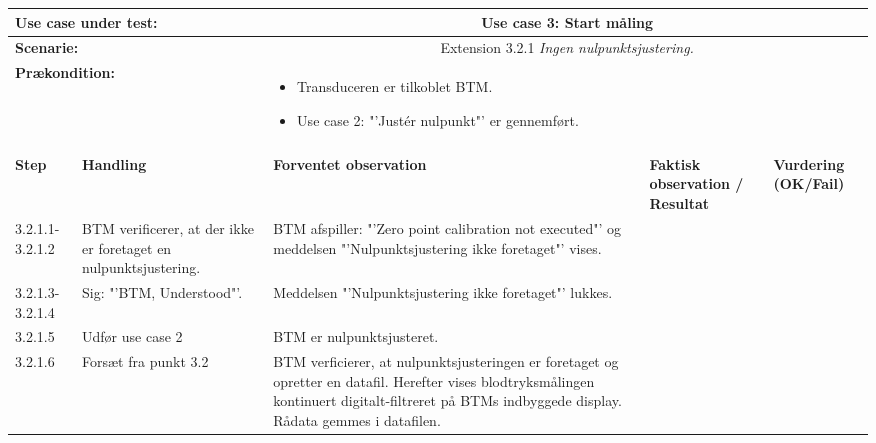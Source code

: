 \begin{tabular}{|p{1cm}|p{3cm}|p{4cm}|p{4cm}|p{2cm}|}
\hline
\multicolumn{2}{|p{3cm}|}{\textbf{Use case under test:}} & \multicolumn{3}{c|}{Use case 3: Start måling} \\\hline

\multicolumn{2}{|p{3cm}|}{\textbf{Scenarie:}} & \multicolumn{3}{c|}{Extension 3.2.1 \textit{Ingen nulpunktsjustering.}} \\\hline

\multicolumn{2}{|p{3cm}|}{\textbf{Prækondition:}}  & \multicolumn{3}{l|}{\parbox{0.6\textwidth}{
\begin{itemize}[label=$\circ$]
\item Transduceren er tilkoblet BTM.
\item Use case 2: "'Justér nulpunkt"' er gennemført. 
\end{itemize} }}\\\hline

\multicolumn{5}{|c|}{} \\\hline

\textbf{Step} & \textbf{Handling} & \textbf{Forventet observation} & \textbf{Faktisk observation / Resultat} & \textbf{Vurdering (OK/Fail)}\\\hline

3.2.1.1-3.2.1.2 & BTM verificerer, at der ikke er foretaget en nulpunktsjustering. & BTM afspiller: "'Zero point calibration not executed"' og meddelsen "'Nulpunktsjustering ikke foretaget"' vises. & & \\\hline
3.2.1.3-3.2.1.4 & Sig: "'BTM, Understood"'. & Meddelsen "'Nulpunktsjustering ikke foretaget"' lukkes.  & & 
\\\hline
3.2.1.5 & Udfør use case 2 & BTM er nulpunktsjusteret. & &
\\\hline
3.2.1.6 & Forsæt fra punkt 3.2 & BTM verficierer, at nulpunktsjusteringen er foretaget og opretter en datafil. Herefter vises blodtryksmålingen kontinuert digitalt-filtreret på BTMs indbyggede display. Rådata gemmes i datafilen. & &
\\\hline

\end{tabular}

\newpage

